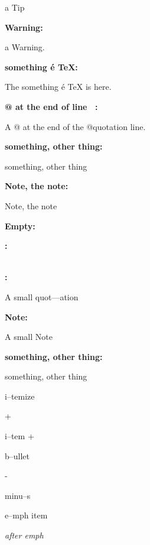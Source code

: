 \documentclass{book}
\begin{document}
a Tip




\textbf{Warning:} 

a Warning.




\textbf{something \'{e} \TeX{}:} 

The something \'{e} \TeX{} is here.




\textbf{@ at the end of line \ {}:} 

A @ at the end of the @quotation line.




\textbf{something, other thing:} 

something, other thing




\textbf{Note, the note:} 

Note, the note






\textbf{Empty:} 



\textbf{:} 



\textbf{\leavevmode{}\\:} 



A small quot---ation




\textbf{Note:} 

A small Note




\textbf{something, other thing:} 

something, other thing




\textbullet{} 

i--temize




+ 

i--tem +




\textbullet{} 

b--ullet




- 

minu--s




\emph{} 

e--mph item






\emph{after emph} 
\end{document}

